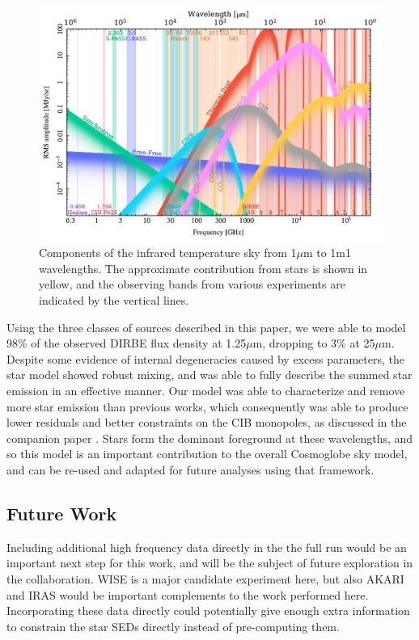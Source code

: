 \documentclass{aa}
\begin{document}
\begin{figure}
  \centering
  \includegraphics[width=\textwidth]{figs/sed/cg_spec.pdf}
  \caption{Components of the infrared temperature sky from 1$\mu$m to 1m1 wavelengths. The approximate contribution from stars is shown in yellow, and the observing bands from various experiments are indicated by the vertical lines.}
  \label{fig:sed}
\end{figure}

Using the three classes of sources described in this paper, we were able to model 98\% of the observed DIRBE flux density at 1.25$\mu$m, dropping to 3\% at 25$\mu$m. Despite some evidence of internal degeneracies caused by excess parameters, the star model showed robust mixing, and was able to fully describe the summed star emission in an effective manner. Our model was able to characterize and remove more star emission than previous works, which consequently was able to produce lower residuals and better constraints on the CIB monopoles, as discussed in the companion paper \citet{CG02_03}. Stars form the dominant foreground at these wavelengths, and so this model is an important contribution to the overall Cosmoglobe sky model, and can be re-used and adapted for future analyses using that framework.

\subsection{Future Work}

Including additional high frequency data directly in the the full run would be an important next step for this work, and will be the subject of future exploration in the collaboration. WISE is a major candidate experiment here, but also   AKARI \citep{akari} and IRAS \citep{iras} would be important complements to the work performed here. Incorporating these data directly could potentially give enough extra information to constrain the star SEDs directly instead of pre-computing them.
\end{document}
